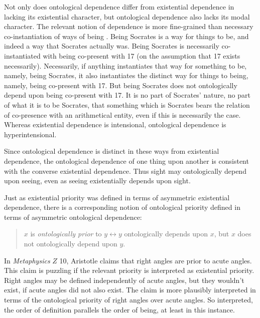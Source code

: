 \documentclass[12pt]{article}
\begin{document}
Not only does ontological dependence differ from existential dependence in lacking its existential character, but ontological dependence also lacks its modal character. The relevant notion of dependence is more fine-grained than necessary co-instantiation of ways of being \citep[see][]{Fine:1994uq,Fine:1995ls,Schaffer:2009vn,Rosen:2010kx}. Being Socrates is a way for things to be, and indeed a way that Socrates actually was. Being Socrates is necessarily co-instantiated with being co-present with 17 (on the assumption that 17 exists necessarily). Necessarily, if anything instantiates that way for something to be, namely, being Socrates, it also instantiates the distinct way for things to being, namely, being co-present with 17. But being Socrates does not ontologically depend upon being co-present with 17. It is no part of Socrates' nature, no part of what it is to be Socrates, that something which is Socrates bears the relation of co-presence with an arithmetical entity, even if this is necessarily the case. Whereas existential dependence is intensional, ontological dependence is hyperintensional.

Since ontological dependence is distinct in these ways from existential dependence, the ontological dependence of one thing upon another is consistent with the converse existential dependence. Thus sight may ontologically depend upon seeing, even as seeing existentially depends upon sight. 


Just as existential priority was defined in terms of asymmetric existential dependence, there is a corresponding notion of ontological priority defined in terms of asymmetric ontological dependence:
\begin{quote}
	\( x \) is \emph{ontologically prior} to \( y  \leftrightarrow  y \) ontologically depends upon \( x \), but \( x \) does not ontologically depend upon \( y \).
\end{quote}
In \emph{Metaphysics} \( Z \) 10, Aristotle claims that right angles are prior to acute angles. This claim is puzzling if the relevant priority is interpreted as existential priority. Right angles may be defined independently of acute angles, but they wouldn't exist, if acute angles did not also exist. The claim is more plausibly interpreted in terms of the ontological priority of right angles over acute angles. So interpreted, the order of definition parallels the order of being, at least in this instance.
\end{document}
